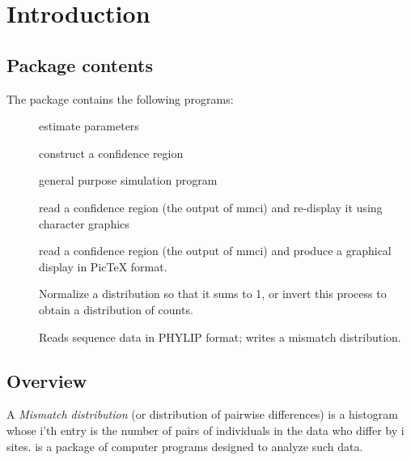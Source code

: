 \chapter{Introduction\label{ch.intro}}

\section{Package contents}

The package contains the following programs:
\begin{description}
\item[] estimate parameters
\item[] construct a confidence region
\item[] general purpose simulation program
\item[] read a confidence region (the output of mmci)
and re-display it using character graphics
\item[] read a confidence region (the output of mmci)
and produce a graphical display in PicTeX format. 
\item[] Normalize a distribution so that it sums to 1, or
      invert this process to obtain a distribution of counts.
\item[] Reads sequence data in PHYLIP format; writes a mismatch
      distribution.  
\end{description}

\section{Overview}

A \emph{Mismatch distribution} (or distribution of pairwise
differences) is a histogram whose i'th entry is the number of pairs of
individuals in the data who differ by i sites.   is a
package of computer programs designed to analyze such data.

